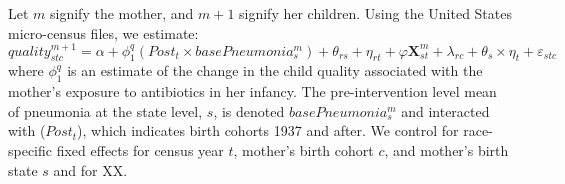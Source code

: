 \documentclass[subeqn]{article}
\begin{document}
\begin{spacing}{1.4}

Let $m$ signify the mother, and $m+1$ signify her children. Using the United States micro-census files, we estimate:
\begin{equation}
  \label{TWINeqn:BV}
  quality^{m+1}_{stc} = \alpha + \phi^q_1 (Post_t\times basePneumonia^m_s) +\theta_{rs} +\eta_{rt}
  +\varphi\mathbf{X}^m_{st}+\lambda_{rc}+\theta_s\times\eta_t+\varepsilon_{stc}
\end{equation}
where $\phi^q_1$ is an estimate of the change in the child quality associated with the mother's exposure to antibiotics in her infancy. The pre-intervention level mean of pneumonia at the state level, $s$, is denoted $basePneumonia^m_s$ and interacted with ($Post_t$), which indicates birth cohorts 1937 and after. We control for race-specific fixed effects for census year $t$, mother's birth cohort $c$, and mother's birth state $s$ and for XX. 




\end{spacing}
\end{document}
